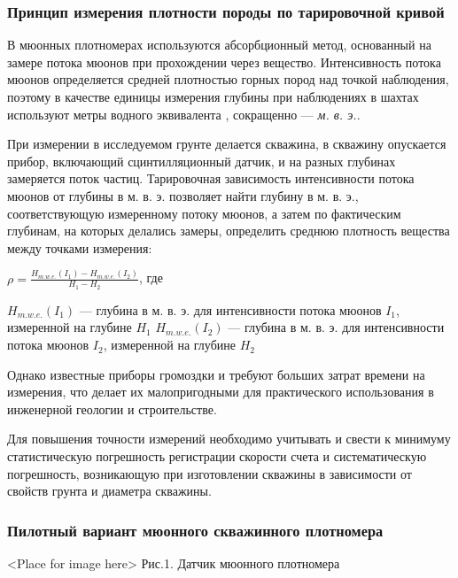 \documentclass[a4paper,10pt]{article}
\begin{document}
\subsubsection{Принцип измерения плотности породы по тарировочной кривой}

В мюонных плотномерах используются абсорбционный метод, 
основанный на замере потока мюонов при прохождении
через вещество. Интенсивность потока мюонов определяется 
средней плотностью горных пород над точкой наблюдения, 
поэтому в качестве единицы измерения глубины 
при наблюдениях в шахтах используют метры водного эквивалента
, сокращенно --- \textit{м. в. э.}. 

При измерении в исследуемом грунте делается скважина, 
в скважину опускается прибор, включающий сцинтилляционный датчик, 
и на разных глубинах замеряется поток частиц. 
Тарировочная зависимость интенсивности потока 
мюонов от глубины в м. в. э. позволяет найти глубину 
в м. в. э., соответствующую измеренному потоку мюонов,
а затем по фактическим глубинам, на которых делались замеры, 
определить среднюю плотность вещества между точками измерения:

\begin{center}
$\mathit{\rho = \frac{H_{m.w.e.}(I_1) - H_{m.w.e.}(I_2)}{H_1-H_2}}$, где
\end{center}


$H_{m.w.e.}(I_1)$ --- глубина в м. в. э. для интенсивности потока мюонов $I_1$, измеренной на глубине $H_1$
$H_{m.w.e.}(I_2)$ --- глубина в м. в. э. для интенсивности потока мюонов $I_2$, измеренной на глубине $H_2$

Однако известные приборы громоздки и требуют больших затрат времени 
на измерения, что делает их малопригодными для практического 
использования в инженерной геологии и строительстве. 

Для повышения точности измерений необходимо учитывать и свести 
к минимуму статистическую погрешность регистрации скорости 
счета и систематическую погрешность, возникающую при 
изготовлении скважины в зависимости от свойств грунта и 
диаметра скважины.

\subsubsection{Пилотный вариант мюонного скважинного плотномера}

\begin{center}
<Place for image here>
Рис.1. Датчик мюонного плотномера
\end{center}
\end{document}
